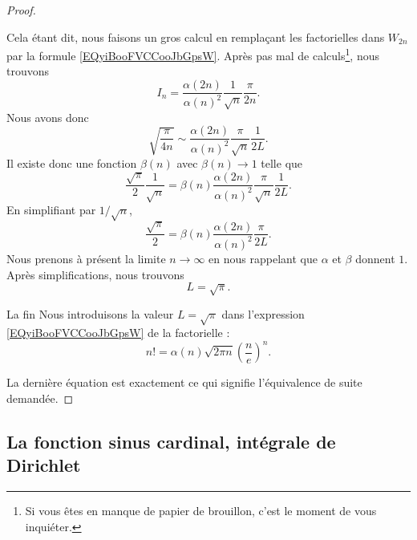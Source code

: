 \begin{proof}
\begin{subproof}
		Cela étant dit, nous faisons un gros calcul en remplaçant les factorielles dans \( W_{2n}\) par la formule \eqref{EQyiBooFVCCooJbGpsW}. Après pas mal de calculs\footnote{Si vous êtes en manque de papier de brouillon, c'est le moment de vous inquiéter.}, nous trouvons
		\begin{equation}
			I_n=\frac{ \alpha(2n) }{ \alpha(n)^2 }\frac{1}{ \sqrt{ n } }\frac{ \pi }{ 2n }.
		\end{equation}
		Nous avons donc
		\begin{equation}
			\sqrt{ \frac{ \pi }{ 4n } }\sim \frac{ \alpha(2n) }{ \alpha(n)^2 }\frac{ \pi }{ \sqrt{ n } }\frac{1}{ 2L }.
		\end{equation}
		Il existe donc une fonction \( \beta(n)\) avec \( \beta(n)\to 1\) telle que
		\begin{equation}
			\frac{ \sqrt{ \pi } }{2}\frac{1}{ \sqrt{ n } }=\beta(n)\frac{ \alpha(2n) }{ \alpha(n)^2 }\frac{ \pi }{ \sqrt{ n } }\frac{1}{ 2L }.
		\end{equation}
		En simplifiant par \( 1/\sqrt{ n }\),
		\begin{equation}
			\frac{ \sqrt{ \pi } }{2}=\beta(n)\frac{ \alpha(2n) }{ \alpha(n)^2 }\frac{\pi}{ 2L }.
		\end{equation}
		Nous prenons à présent la limite \( n\to \infty\) en nous rappelant que \( \alpha\) et \( \beta \) donnent \( 1\). Après simplifications, nous trouvons
		\begin{equation}
			L=\sqrt{ \pi }.
		\end{equation}

		\item[La fin]
		Nous introduisons la valeur \( L=\sqrt{ \pi }\) dans l'expression \eqref{EQyiBooFVCCooJbGpsW} de la factorielle :
		\begin{equation}
			n!=\alpha(n)\sqrt{ 2\pi n }\left( \frac{ n }{ e } \right)^n.
		\end{equation}
	\end{subproof}
	La dernière équation est exactement ce qui signifie l'équivalence de suite demandée.
\end{proof}

\subsection{La fonction sinus cardinal, intégrale de Dirichlet}

